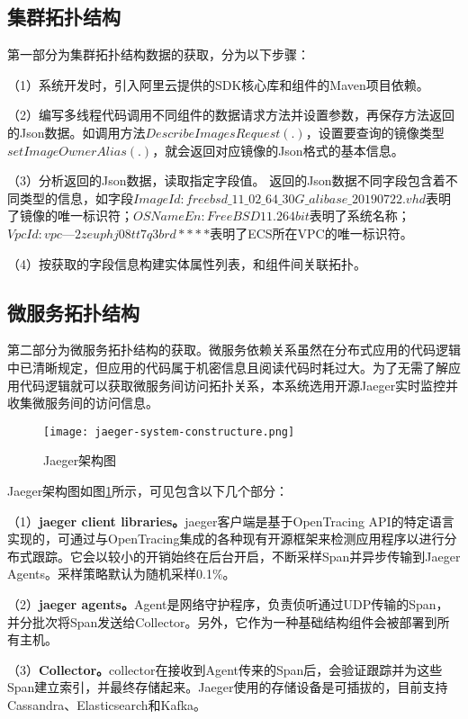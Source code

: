 \subsection{集群拓扑结构}
第一部分为集群拓扑结构数据的获取，分为以下步骤：

（1）系统开发时，引入阿里云提供的SDK核心库和组件的Maven项目依赖。

（2）编写多线程代码调用不同组件的数据请求方法并设置参数，再保存方法返回的Json数据。如调用方法$DescribeImagesRequest(.)$，设置要查询的镜像类型$setImageOwnerAlias(.)$，就会返回对应镜像的Json格式的基本信息。

（3）分析返回的Json数据，读取指定字段值。
返回的Json数据不同字段包含着不同类型的信息，如字段$ ImageId: freebsd\_11\_02\_64\_30G\_alibase\_20190722.vhd$表明了镜像的唯一标识符；$OSNameEn: FreeBSD  11.2 64 bit$表明了系统名称；$VpcId:vpc—2zeuphj08tt7q3brd****$表明了ECS所在VPC的唯一标识符。

（4）按获取的字段信息构建实体属性列表，和组件间关联拓扑。

\subsection{微服务拓扑结构}
第二部分为微服务拓扑结构的获取。微服务依赖关系虽然在分布式应用的代码逻辑中已清晰规定，但应用的代码属于机密信息且阅读代码时耗过大。为了无需了解应用代码逻辑就可以获取微服务间访问拓扑关系，本系统选用开源Jaeger实时监控并收集微服务间的访问信息。
\begin{figure}[htbp]
    \centering
    \texttt{[image: jaeger-system-constructure.png]}
    \caption{Jaeger架构图\label{jaeger-system-constructure}}
\end{figure}

Jaeger架构图如图\ref{jaeger-system-constructure}所示，可见包含以下几个部分：

（1）\textbf{jaeger client libraries。}jaeger客户端是基于OpenTracing API的特定语言实现的，可通过与OpenTracing集成的各种现有开源框架来检测应用程序以进行分布式跟踪。它会以较小的开销始终在后台开启，不断采样Span并异步传输到Jaeger Agents。采样策略默认为随机采样0.1\%。

（2）\textbf{jaeger agents。}Agent是网络守护程序，负责侦听通过UDP传输的Span，并分批次将Span发送给Collector。另外，它作为一种基础结构组件会被部署到所有主机。

（3）\textbf{Collector。}collector在接收到Agent传来的Span后，会验证跟踪并为这些Span建立索引，并最终存储起来。Jaeger使用的存储设备是可插拔的，目前支持Cassandra、Elasticsearch和Kafka。

